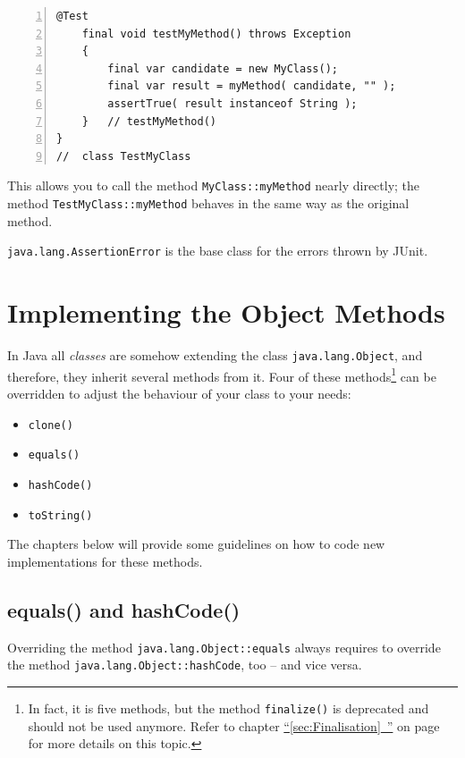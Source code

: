 \documentclass[11pt,a4paper, titlepage, parskip=half, headsepline, footsepline, cleardoublepage=current, headheight=1cm]{scrbook}
\newcommand*{\tqfullvref}[1]{\hyperref[{#1}]{“\ref*{#1}~\nameref*{#1}”} on page~\pageref{#1}}
\begin{document}
\begin{lstlisting}[numbers=left]
    @Test
    final void testMyMethod() throws Exception
    {
        final var candidate = new MyClass();
        final var result = myMethod( candidate, "" );
        assertTrue( result instanceof String );
    }   // testMyMethod()
}
//  class TestMyClass  
\end{lstlisting}
This allows you to call the method \lstinline|MyClass::myMethod| nearly directly; the method \lstinline|TestMyClass::myMethod| behaves in the same way as the original method.

\lstinline|java.lang.AssertionError|\autocite{ORACLE_DOC_ASSERTIONERROR_CLASS} is the base class for the errors thrown by JUnit\autocite{JUNIT5}.

\section{Implementing the Object Methods}
In Java all \textit{classes} are somehow extending the class \lstinline|java.lang.Object|\autocite{ORACLE_DOC_OBJECT_CLASS}, and therefore, they inherit several methods from it. Four of these methods\footnote{In fact, it is five methods, but the method \lstinline|finalize()|\autocite{ORACLE_DOC_OBJECT:finalize} is deprecated and should not be used anymore. Refer to chapter \tqfullvref{sec:Finalisation} for more details on this topic.} can be overridden to adjust the behaviour of your class to your needs:
\begin{itemize}[nosep]
\item{\lstinline|clone()|\autocite{ORACLE_DOC_OBJECT:clone}}
\item{\lstinline|equals()|\autocite{ORACLE_DOC_OBJECT:equals}}
\item{\lstinline|hashCode()|\autocite{ORACLE_DOC_OBJECT:hashCode}}
\item{\lstinline|toString()|\autocite{ORACLE_DOC_OBJECT:toString}}
\end{itemize}

The chapters below will provide some guidelines on how to code new implementations for these methods.

\subsection{equals() and hashCode()}\label{sec:EqualsAndHashCode}
Overriding the method \lstinline|java.lang.Object::equals|\autocite{ORACLE_DOC_OBJECT:equals} always requires to override the method \lstinline|java.lang.Object::hashCode|\autocite{ORACLE_DOC_OBJECT:hashCode}, too – and vice versa.
\end{document}
